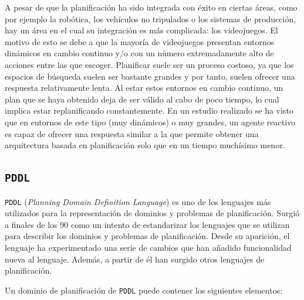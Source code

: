 A pesar de que la planificación ha sido integrada con éxito en ciertas áreas, como por ejemplo la robótica,
los vehículos no tripulados o los sistemas de producción, hay un área en el cual su integración es más
complicada: los videojuegos. El motivo de esto se debe a que la mayoría de videojuegos presentan
entornos dinámicos en cambio continuo y/o con un número extremadamente alto de acciones entre las que escoger.
Planificar suele ser un proceso costoso, ya que los espacios de búsqueda suelen ser bastante grandes y por tanto,
suelen ofrecer una respuesta relativamente lenta. Al estar estos entornos en cambio continuo,
un plan que se haya obtenido deja de ser válido al cabo de poco tiempo, lo cual implica estar
replanificando constantemente. En un estudio realizado \cite{10.1111/coin.12079} se ha visto que en entornos
de este tipo (muy dinámicos) o muy grandes, un agente reactivo es capaz de ofrecer una respuesta similar
a la que permite obtener una arquitectura basada en planificación solo que en un tiempo muchísimo menor. 

\subsection{\texttt{PDDL}}

\texttt{PDDL} (\textit{Planning Domain Definition Language}) \cite{pddl} es uno de los lenguajes más utilizados
para la representación de dominios y problemas de planificación. Surgió a finales de los 90
como un intento de estandarizar los lenguajes que se utilizan para describir los dominios
y problemas de planificación. Desde su aparición, el lenguaje ha experimentado una serie de cambios que
han añadido funcionalidad nueva al lenguaje. Además, a partir de él han surgido otros lenguajes de planificación.

Un dominio de planificación de \texttt{PDDL} puede contener los siguientes elementos:

